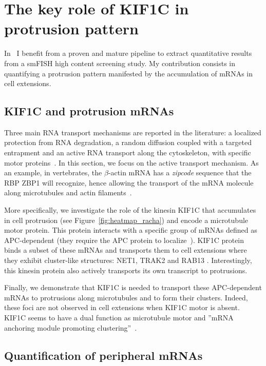 \section{The key role of KIF1C in protrusion pattern}
\label{sec:protrusion}

In~\cite{pichon_kinesin_2021} I benefit from a proven and mature pipeline to extract quantitative results from a \ac{smFISH} high content screening study.
My contribution consists in quantifying a protrusion pattern manifested by the accumulation of \ac{mRNA}s in cell extensions.

\subsection{KIF1C and protrusion mRNAs}
\label{subsec:introduction_protrusion}

Three main \ac{RNA} transport mechanisms are reported in the literature: a localized protection from \ac{RNA} degradation, a random diffusion coupled with a targeted entrapment and an active \ac{RNA} transport along the cytoskeleton, with specific motor proteins~\cite{Medioni_2012, Bovaird_2018}.
In this section, we focus on the active transport mechanism.
As an example, in vertebrates, the $\beta$-actin \ac{mRNA} has a \emph{zipcode} sequence that the \ac{RBP} ZBP1 will recognize, hence allowing the transport of the \ac{mRNA} molecule along microtubules and actin filaments~\cite{Oleynikov_2003}.

More specifically, we investigate the role of the kinesin KIF1C that accumulates in cell protrusion (see Figure~\ref{fig:heatmap_racha}) and encode a microtubule motor protein.
This protein interacts with a specific group of \ac{mRNA}s defined as APC-dependent (they require the APC protein to localize~\cite{wang_extracellular_2017}).
KIF1C protein binds a subset of these \ac{mRNA}s and transports them to cell extensions where they exhibit cluster-like structures: NET1, TRAK2 and RAB13 .
Interestingly, this kinesin protein also actively transports its own transcript to protrusions.

Finally, we demonstrate that KIF1C is needed to transport these APC-dependent \ac{mRNA}s to protrusions along microtubules and to form their clusters.
Indeed, these foci are not observed in cell extensions when KIF1C motor is absent.
KIF1C seems to have a dual function as microtubule motor and ''\ac{mRNA} anchoring module promoting clustering''~\cite{pichon_kinesin_2021}.

\subsection{Quantification of peripheral mRNAs}
\label{subsec:materials_results_protrusion}

